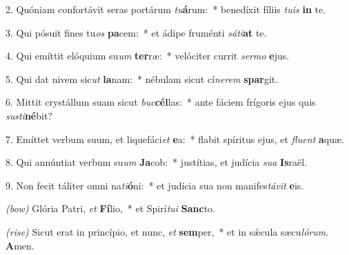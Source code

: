 2. Quóniam confortávit seras portárum \textit{tu}\textbf{á}rum:~* benedíxit fíliis \textit{tu}\textit{is} \textbf{in} te.

3. Qui pósuit fines tu\textit{os} \textbf{pa}cem:~* et ádipe fruménti \textit{sá}\textit{ti}\textbf{at} te.

4. Qui emíttit elóquium su\textit{um} \textbf{ter}ræ:~* velóciter currit \textit{ser}\textit{mo} \textbf{e}jus.

5. Qui dat nivem sic\textit{ut} \textbf{la}nam:~* nébulam sicut cí\textit{ne}\textit{rem} \textbf{spar}git.

6. Mittit crystállum suam sicut \textit{buc}\textbf{cél}las:~* ante fáciem frígoris ejus quis \textit{sus}\textit{ti}\textbf{né}bit?

7. Emíttet verbum suum, et liquefáci\textit{et} \textbf{e}a:~* flabit spíritus ejus, et \textit{flu}\textit{ent} \textbf{a}quæ.

8. Qui annúntiat verbum su\textit{um} \textbf{Ja}cob:~* justítias, et judícia \textit{su}\textit{a} \textbf{Is}raël.

9. Non fecit táliter omni na\textit{ti}\textbf{ó}ni:~* et judícia sua non manifes\textit{tá}\textit{vit} \textbf{e}is.

\textit{(bow)} Glória Patri, \textit{et} \textbf{Fí}lio,~* et Spirí\textit{tu}\textit{i} \textbf{Sanc}to.

\textit{(rise)} Sicut erat in princípio, et nunc, \textit{et} \textbf{sem}per,~* et in s\'{\ae}cula sæcu\textit{ló}\textit{rum}. \textbf{A}men.